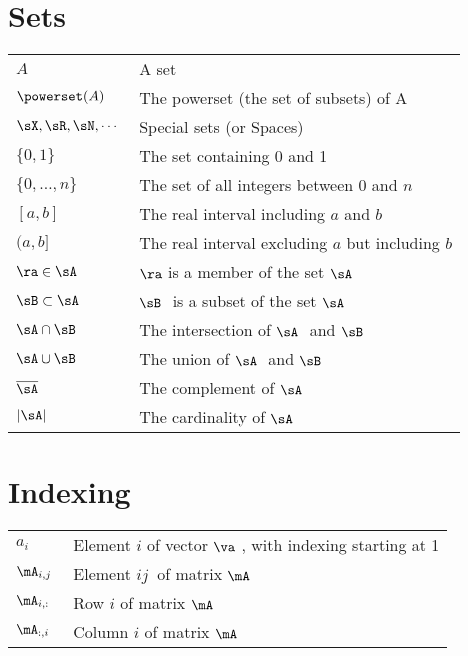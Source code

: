 \section*{Sets}
\bgroup{}
\begin{tabular}{>{\centering}p{1.2in}p{4in}}
  \(\displaystyle A~\) & A set\\
  \(\displaystyle \powerset(A)~\) & The powerset (the set of subsets) of A\\
  \(\displaystyle \sX, \sR, \sN, \cdots~\) & Special sets (or Spaces) \\
  \(\displaystyle \{0, 1\}~\) & The set containing 0 and 1 \\
  \(\displaystyle \{0, \dots, n \}~\) & The set of all integers between  \(0\) and  \(n\) \\
  \(\displaystyle [a, b]~\) & The real interval including  \(a\) and  \(b\) \\
  \(\displaystyle (a, b]~\) & The real interval excluding  \(a\) but including  \(b\) \\
  \(\displaystyle \ra \in \sA~\) &  \(\ra\) is a member of the set  \(\sA~\) \\
  \(\displaystyle \sB \subset \sA~\) &  \(\sB~\) is a subset of the set  \(\sA~\) \\
  \(\displaystyle \sA \cap \sB~\) & The intersection of  \(\sA~\) and  \(\sB~\) \\
  \(\displaystyle \sA \cup \sB~\) & The union of  \(\sA~\) and  \(\sB~\) \\
  \(\displaystyle \overline{\sA}~\) & The complement of  \(\sA~\) \\
  \(\displaystyle |{\sA}|~\) & The cardinality of  \(\sA~\) \\

\end{tabular}

\egroup{}

\section*{Indexing}
\bgroup{}
\begin{tabular}{>{\centering}p{1.2in}p{4in}}
  \(\displaystyle a_i~\) & Element  \(i\) of vector  \(\va~\), with indexing starting at 1 \\
  \(\displaystyle \mA_{i,j}~\) & Element  \(i j~\) of matrix  \(\mA~\) \\
  \(\displaystyle \mA_{i, :}~\) & Row  \(i\) of matrix  \(\mA~\) \\
  \(\displaystyle \mA_{:, i}~\) & Column  \(i\) of matrix  \(\mA~\) \\
\end{tabular}
\egroup{}

